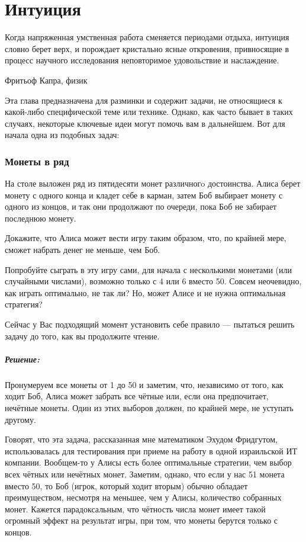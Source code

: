 \chapter*{Интуиция}
                                         

\epigraph{Когда напряженная
умственная  работа  сменяется  периодами  отдыха,  интуиция
словно  берет  верх,  и  порождает кристально ясные откровения,
привносящие  в  процесс  научного   исследования   неповторимое
удовольствие и наслаждение.}{Фритьоф Капра, физик}

Эта глава предназначена для разминки и  содержит задачи, не относящиеся к какой-либо специфической теме или технике. Однако, как часто бывает в таких случаях, некоторые  ключевые идеи могут помочь вам в дальнейшем.  Вот для начала одна из подобных задач:




\subsection*{Монеты в ряд} %


На столе выложен ряд из пятидесяти монет различногo достоинства. Алиса берет монету с одного конца и кладет себе в карман, затем Боб выбирает монету с одного из концов, и так они продолжают по очереди, пока Боб не забирает последнюю монету.

Докажите, что Алиса может вести игру таким образом, что, по крайней мере, сможет набрать денег не меньше, чем Боб.

\medskip

Попробуйте сыграть в эту игру сами, для начала с несколькими монетами (или случайными числами), возможно только с 4 или 6 вместо 50. 
Совсем неочевидно, как играть оптимально, не так ли?
Но, может Алисе и не нужна оптимальная стратегия? 

Сейчас у Вас подходящий момент установить себе правило --- пытаться решить задачу до того, как вы продолжите чтение.


\paragraph{Решение:}
Пронумеруем все монеты от 1 до 50 и заметим, что, независимо от того, как ходит Боб, Алиса может забрать все чётные или, если она предпочитает, нечётные монеты.
Один из этих выборов должен, по крайней мере, не уступать другому.
\heart


Говорят, что эта задача, рассказанная мне математиком  Эхудом Фридгутом, использовалась для тестирования при приеме на работу в одной израильской ИТ компании. 
Вообщем-то у Алисы есть более оптимальные стратегии, чем выбор всех чётных или нечётных монет.
Заметим, однако, что если у нас 51 монета вместо 50, то Боб (игрок, который ходит вторым) обычно обладает преимуществом, несмотря на меньшее, чем у Алисы, количество собранных монет.  
Кажется парадоксальным, что чётность числа монет имеет такой огромный эффект на результат игры, при том, что монеты берутся только с концов.


